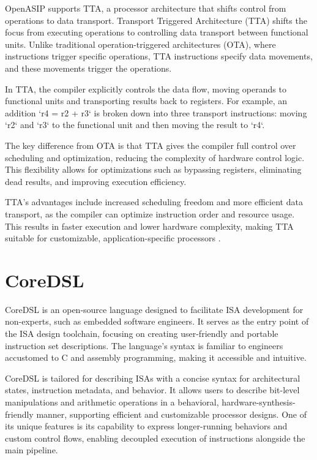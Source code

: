 OpenASIP supports TTA, a processor architecture that shifts control from operations to data transport. Transport Triggered Architecture (TTA) shifts the focus from executing operations to controlling data transport between functional units. Unlike traditional operation-triggered architectures (OTA), where instructions trigger specific operations, TTA instructions specify data movements, and these movements trigger the operations.

In TTA, the compiler explicitly controls the data flow, moving operands to functional units and transporting results back to registers. For example, an addition `r4 = r2 + r3` is broken down into three transport instructions: moving `r2` and `r3` to the functional unit and then moving the result to `r4`.

The key difference from OTA is that TTA gives the compiler full control over scheduling and optimization, reducing the complexity of hardware control logic. This flexibility allows for optimizations such as bypassing registers, eliminating dead results, and improving execution efficiency.

TTA's advantages include increased scheduling freedom and more efficient data transport, as the compiler can optimize instruction order and resource usage. This results in faster execution and lower hardware complexity, making TTA suitable for customizable, application-specific processors \cite{hoogerbrugge1994transport}.


\section{CoreDSL}

CoreDSL is an open-source language designed to facilitate ISA development for non-experts, such as embedded software engineers. It serves as the entry point of the ISA design toolchain, focusing on creating user-friendly and portable instruction set descriptions. The language's syntax is familiar to engineers accustomed to C and assembly programming, making it accessible and intuitive.

CoreDSL is tailored for describing ISAs with a concise syntax for architectural states, instruction metadata, and behavior. It allows users to describe bit-level manipulations and arithmetic operations in a behavioral, hardware-synthesis-friendly manner, supporting efficient and customizable processor designs. One of its unique features is its capability to express longer-running behaviors and custom control flows, enabling decoupled execution of instructions alongside the main pipeline.

